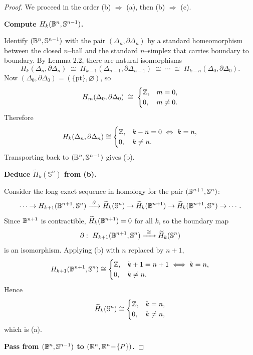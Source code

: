 \begin{proof}
We proceed in the order (b) $\Rightarrow$ (a), then (b) $\Rightarrow$ (c).

\smallskip
\noindent\textbf{Compute $H_k(\mathbb{B}^n,\mathbb{S}^{n-1})$.}

Identify $(\mathbb{B}^n,\mathbb{S}^{n-1})$ with the pair $(\Delta_n,\partial \Delta_n)$ by a standard homeomorphism 
between the closed $n$–ball and the standard $n$–simplex that carries boundary to boundary.
By Lemma 2.2, there are natural isomorphisms
\[
H_k(\Delta_n,\partial \Delta_n)
\;\cong\; H_{k-1}(\Delta_{n-1},\partial \Delta_{n-1})
\;\cong\;\cdots\;\cong\; H_{k-n}(\Delta_0,\partial \Delta_0).
\]
Now $(\Delta_0,\partial \Delta_0)=(\{\text{pt}\},\varnothing)$, so
\[
H_m(\Delta_0,\partial \Delta_0)\;\cong\;
\begin{cases}
\Bbb Z,& m=0,\\
0,& m\ne 0.
\end{cases}
\]
Therefore
\[
H_k(\Delta_n,\partial \Delta_n)\cong
\begin{cases}
\Bbb Z,& k-n=0\ \Leftrightarrow\ k=n,\\
0,& k\ne n.
\end{cases}
\]
Transporting back to $(\mathbb{B}^n,\mathbb{S}^{n-1})$ gives (b).

\smallskip
\noindent\textbf{Deduce $\widetilde H_k(\mathbb{S}^n)$ from (b).}

Consider the long exact sequence in homology for the pair $(\mathbb{B}^{n+1},\mathbb{S}^n)$:
\[
\cdots\to H_{k+1}(\mathbb{B}^{n+1},\mathbb{S}^n)\xrightarrow{\ \partial\ } \widetilde H_k(\mathbb{S}^n)
\to \widetilde H_k(\mathbb{B}^{n+1}) \to \widetilde H_k(\mathbb{B}^{n+1},\mathbb{S}^n)\to \cdots .
\]
Since $\mathbb{B}^{n+1}$ is contractible, $\widetilde H_k(\mathbb{B}^{n+1})=0$ for all $k$, so the boundary map
\[
\partial:\ H_{k+1}(\B^{n+1},\mathbb{S}^n)\xrightarrow{\ \cong\ }\widetilde H_k(\mathbb{S}^n)
\]
is an isomorphism. Applying (b) with $n$ replaced by $n+1$,
\[
H_{k+1}(\mathbb{B}^{n+1},\mathbb{S}^n)\cong
\begin{cases}
\Bbb Z,& k+1=n+1 \iff k=n,\\
0,& k\ne n.
\end{cases}
\]
Hence
\[
\widetilde H_k(\mathbb{S}^n)\cong
\begin{cases}
\Bbb Z,& k=n,\\
0,& k\ne n,
\end{cases}
\]
which is (a).

\smallskip
\noindent\textbf{Pass from $(\mathbb{B}^n,\mathbb{S}^{n-1})$ to $(\Bbb R^n,\Bbb R^n\!-\!\{P\})$.}


\end{proof}
